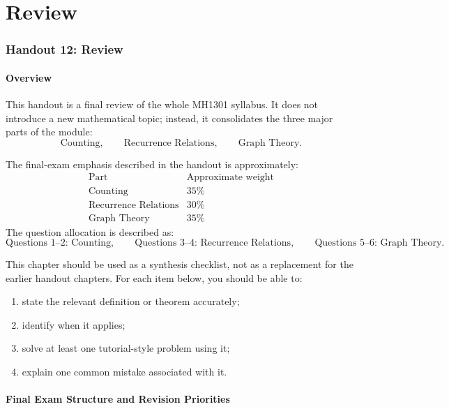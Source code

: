\part{Review}
\section{Handout 12: Review}

\subsection{Overview}

This handout is a final review of the whole MH1301 syllabus. It does not introduce a new mathematical topic; instead, it consolidates the three major parts of the module:
\[
\text{Counting},
\qquad
\text{Recurrence Relations},
\qquad
\text{Graph Theory}.
\]

The final-exam emphasis described in the handout is approximately:
\[
\begin{array}{c|c}
\text{Part} & \text{Approximate weight} \\ \hline
\text{Counting} & 35\% \\
\text{Recurrence Relations} & 30\% \\
\text{Graph Theory} & 35\%
\end{array}
\]
The question allocation is described as:
\[
\text{Questions 1--2: Counting},
\qquad
\text{Questions 3--4: Recurrence Relations},
\qquad
\text{Questions 5--6: Graph Theory}.
\]

\begin{examtip}[title={How to read this review chapter}]
This chapter should be used as a synthesis checklist, not as a replacement for the earlier handout chapters. For each item below, you should be able to:
\begin{enumerate}[leftmargin=*]
    \item state the relevant definition or theorem accurately;
    \item identify when it applies;
    \item solve at least one tutorial-style problem using it;
    \item explain one common mistake associated with it.
\end{enumerate}
\end{examtip}

\subsection{Final Exam Structure and Revision Priorities}

